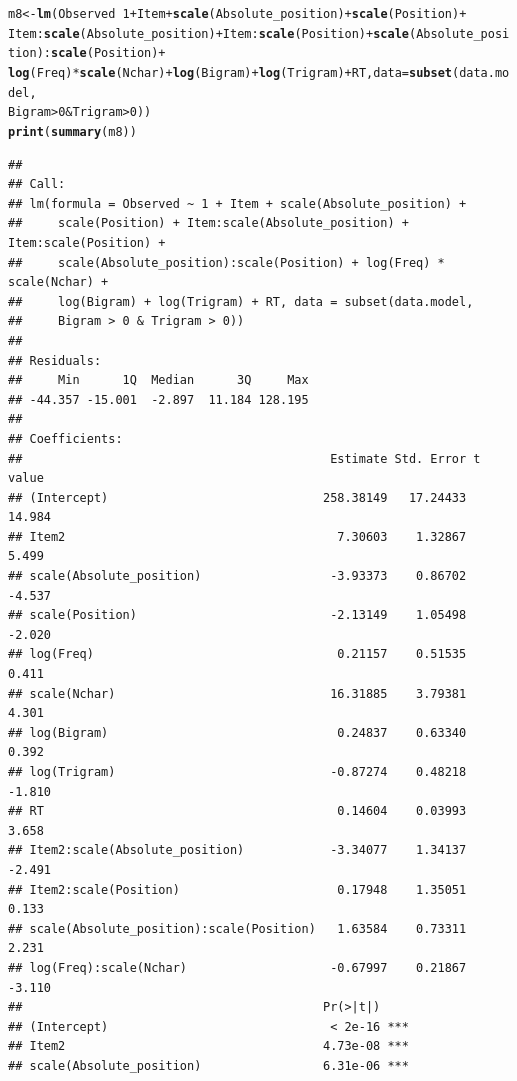 \documentclass{article}\usepackage[]{graphicx}\usepackage[]{color}
\makeatletter
\newcommand{\hlnum}[1]{\textcolor[rgb]{0.686,0.059,0.569}{#1}}%
\newcommand{\hlopt}[1]{\textcolor[rgb]{0,0,0}{#1}}%
\newcommand{\hlstd}[1]{\textcolor[rgb]{0.345,0.345,0.345}{#1}}%
\newcommand{\hlkwb}[1]{\textcolor[rgb]{0.69,0.353,0.396}{#1}}%
\newcommand{\hlkwc}[1]{\textcolor[rgb]{0.333,0.667,0.333}{#1}}%
\newcommand{\hlkwd}[1]{\textcolor[rgb]{0.737,0.353,0.396}{\textbf{#1}}}%
\newenvironment{kframe}{%
 \def\at@end@of@kframe{}%
 \ifinner\ifhmode%
  \def\at@end@of@kframe{\end{minipage}}%
  \begin{minipage}{\columnwidth}%
 \fi\fi%
 \def\FrameCommand##1{\hskip\@totalleftmargin \hskip-\fboxsep
 \colorbox{shadecolor}{##1}\hskip-\fboxsep
     \hskip-\linewidth \hskip-\@totalleftmargin \hskip\columnwidth}%
 \MakeFramed {\advance\hsize-\width
   \@totalleftmargin\z@ \linewidth\hsize
   \@setminipage}}%
 {\par\unskip\endMakeFramed%
 \at@end@of@kframe}
\newenvironment{knitrout}{}{} %
\makeatother
\begin{document}
\begin{knitrout}
\begin{kframe}
\begin{alltt}
\hlstd{m8} \hlkwb{<-} \hlkwd{lm}\hlstd{(Observed} \hlopt{~} \hlnum{1} \hlopt{+} \hlstd{Item} \hlopt{+} \hlkwd{scale}\hlstd{(Absolute_position)} \hlopt{+} \hlkwd{scale}\hlstd{(Position)} \hlopt{+}
    \hlstd{Item}\hlopt{:}\hlkwd{scale}\hlstd{(Absolute_position)} \hlopt{+} \hlstd{Item}\hlopt{:}\hlkwd{scale}\hlstd{(Position)} \hlopt{+} \hlkwd{scale}\hlstd{(Absolute_position)}\hlopt{:}\hlkwd{scale}\hlstd{(Position)} \hlopt{+}
    \hlkwd{log}\hlstd{(Freq)} \hlopt{*} \hlkwd{scale}\hlstd{(Nchar)} \hlopt{+} \hlkwd{log}\hlstd{(Bigram)} \hlopt{+} \hlkwd{log}\hlstd{(Trigram)} \hlopt{+} \hlstd{RT,} \hlkwc{data} \hlstd{=} \hlkwd{subset}\hlstd{(data.model,}
    \hlstd{Bigram} \hlopt{>} \hlnum{0} \hlopt{&} \hlstd{Trigram} \hlopt{>} \hlnum{0}\hlstd{))}
\hlkwd{print}\hlstd{(}\hlkwd{summary}\hlstd{(m8))}
\end{alltt}
\begin{verbatim}
## 
## Call:
## lm(formula = Observed ~ 1 + Item + scale(Absolute_position) + 
##     scale(Position) + Item:scale(Absolute_position) + Item:scale(Position) + 
##     scale(Absolute_position):scale(Position) + log(Freq) * scale(Nchar) + 
##     log(Bigram) + log(Trigram) + RT, data = subset(data.model, 
##     Bigram > 0 & Trigram > 0))
## 
## Residuals:
##     Min      1Q  Median      3Q     Max 
## -44.357 -15.001  -2.897  11.184 128.195 
## 
## Coefficients:
##                                           Estimate Std. Error t value
## (Intercept)                              258.38149   17.24433  14.984
## Item2                                      7.30603    1.32867   5.499
## scale(Absolute_position)                  -3.93373    0.86702  -4.537
## scale(Position)                           -2.13149    1.05498  -2.020
## log(Freq)                                  0.21157    0.51535   0.411
## scale(Nchar)                              16.31885    3.79381   4.301
## log(Bigram)                                0.24837    0.63340   0.392
## log(Trigram)                              -0.87274    0.48218  -1.810
## RT                                         0.14604    0.03993   3.658
## Item2:scale(Absolute_position)            -3.34077    1.34137  -2.491
## Item2:scale(Position)                      0.17948    1.35051   0.133
## scale(Absolute_position):scale(Position)   1.63584    0.73311   2.231
## log(Freq):scale(Nchar)                    -0.67997    0.21867  -3.110
##                                          Pr(>|t|)    
## (Intercept)                               < 2e-16 ***
## Item2                                    4.73e-08 ***
## scale(Absolute_position)                 6.31e-06 ***

\end{verbatim}
\end{kframe}
\end{knitrout}
\end{document}
